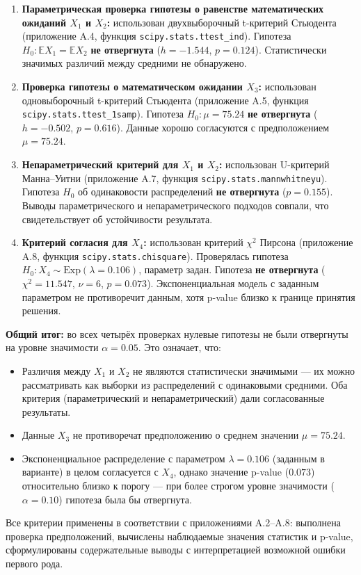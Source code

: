 \begin{enumerate}
    \item \textbf{Параметрическая проверка гипотезы о равенстве математических ожиданий \(X_1\) и \(X_2\):}
    использован двухвыборочный t-критерий Стьюдента (приложение A.4, функция \texttt{scipy.stats.ttest\_ind}).
    Гипотеза \(H_0: \mathbb{E}X_1 = \mathbb{E}X_2\) \textbf{не отвергнута} (\(h = -1.544\), \(p = 0.124\)).
    Статистически значимых различий между средними не обнаружено.

    \item \textbf{Проверка гипотезы о математическом ожидании \(X_3\):}
    использован одновыборочный t-критерий Стьюдента (приложение A.5, функция \texttt{scipy.stats.ttest\_1samp}).
    Гипотеза \(H_0: \mu = 75.24\) \textbf{не отвергнута} (\(h = -0.502\), \(p = 0.616\)).
    Данные хорошо согласуются с предположением \(\mu = 75.24\).

    \item \textbf{Непараметрический критерий для \(X_1\) и \(X_2\):}
    использован U-критерий Манна–Уитни (приложение A.7, функция \texttt{scipy.stats.mannwhitneyu}).
    Гипотеза \(H_0\) об одинаковости распределений \textbf{не отвергнута} (\(p = 0.155\)).
    Выводы параметрического и непараметрического подходов совпали, что свидетельствует об устойчивости результата.

    \item \textbf{Критерий согласия для \(X_4\):}
    использован критерий \(\chi^2\) Пирсона (приложение A.8, функция \texttt{scipy.stats.chisquare}).
    Проверялась гипотеза \(H_0: X_4 \sim \text{Exp}(\lambda = 0.106)\), параметр задан.
    Гипотеза \textbf{не отвергнута} (\(\chi^2 = 11.547\), \(\nu = 6\), \(p = 0.073\)).
    Экспоненциальная модель с заданным параметром не противоречит данным, хотя p-value близко к границе принятия решения.

\end{enumerate}

\textbf{Общий итог:} во всех четырёх проверках нулевые гипотезы не были отвергнуты на уровне значимости \(\alpha = 0.05\). Это означает, что:
\begin{itemize}
    \item Различия между \(X_1\) и \(X_2\) не являются статистически значимыми — их можно рассматривать как выборки из распределений с одинаковыми средними. Оба критерия (параметрический и непараметрический) дали согласованные результаты.
    \item Данные \(X_3\) не противоречат предположению о среднем значении \(\mu = 75.24\).
    \item Экспоненциальное распределение с параметром \(\lambda = 0.106\) (заданным в варианте) в целом согласуется с \(X_4\), однако значение p-value (\(0.073\)) относительно близко к порогу — при более строгом уровне значимости (\(\alpha = 0.10\)) гипотеза была бы отвергнута.
\end{itemize}

Все критерии применены в соответствии с приложениями A.2–A.8: выполнена проверка предположений, вычислены наблюдаемые значения статистик и p-value, сформулированы содержательные выводы с интерпретацией возможной ошибки первого рода.
